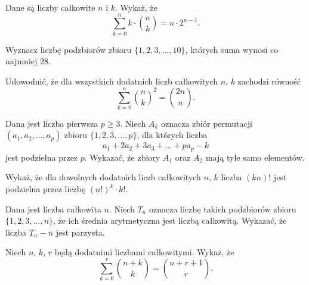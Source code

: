 \begin{problem}{1} 
	Dane są liczby całkowite $n$ i $k$. Wykaż, że
	\[
		\sum^{n}_{k=0} k \cdot {{n}\choose{k}} = n \cdot 2^{n - 1}.
	\]
\end{problem}

\begin{problem}{2}
	Wyznacz liczbę podzbiorów zbioru $\{1, 2, 3, ..., 10\}$, których suma wynosi co najmniej $28$.
\end{problem}

\begin{problem}{3} 
	Udowodnić, że dla wszystkich dodatnich liczb całkowitych $n$, $k$ zachodzi równość
	\[
	    \sum^{n}_{k=0} {{n}\choose{k}}^2 = {{2n}\choose{n}}.
	\]
\end{problem}

\begin{problem}{4}
	Dana jest liczba pierwsza $p \geqslant 3$. Niech $A_k$ oznacza zbiór permutacji $(a_1, a_2, ..., a_p)$ zbioru $\{1, 2, 3,..., p\}$, dla których liczba
	\[
		a_1 + 2a_2 + 3a_3 + ... + pa_p - k
	\]
	jest podzielna przez $p$. Wykazać, że zbiory $A_1$ oraz $A_2$ mają tyle samo elementów.
\end{problem}

\begin{problem}{5}
	Wykaż, że dla dowolnych dodatnich liczb całkowitych $n$, $k$ liczba	$(kn)!$
	jest podzielna przez liczbę $(n!)^k \cdot k!$.
\end{problem}


\begin{problem}{6}
	Dana jest liczba całkowita $n$. Niech $T_n$ oznacza liczbę takich podzbiorów zbioru $\{1, 2, 3, ..., n\}$, że ich średnia arytmetyczna jest liczbą całkowitą. Wykazać, że liczba $T_n - n$ jest parzysta.
\end{problem}


\begin{problem}{7}
	Niech $n$, $k$, $r$ będą dodatnimi liczbami całkowitymi. Wykaż, że
	\[
		\sum^{r}_{k=0} {{n + k}\choose{k}} = {{n + r + 1}\choose{r}} .
	\]
\end{problem}

